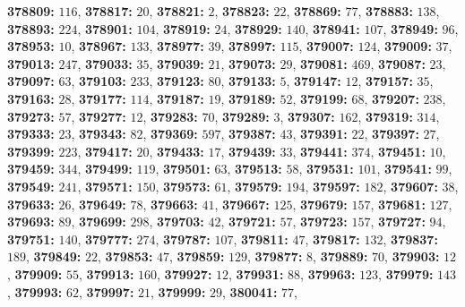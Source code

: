 \textsf{\bfseries 378809:} $116$, \textsf{\bfseries 378817:} $20$, \textsf{\bfseries 378821:} $2$, \textsf{\bfseries 378823:} $22$, \textsf{\bfseries 378869:} $77$, \textsf{\bfseries 378883:} $138$, \textsf{\bfseries 378893:} $224$, \textsf{\bfseries 378901:} $104$, \textsf{\bfseries 378919:} $24$, \textsf{\bfseries 378929:} $140$, \textsf{\bfseries 378941:} $107$, \textsf{\bfseries 378949:} $96$, \textsf{\bfseries 378953:} $10$, \textsf{\bfseries 378967:} $133$, \textsf{\bfseries 378977:} $39$, \textsf{\bfseries 378997:} $115$, \textsf{\bfseries 379007:} $124$, \textsf{\bfseries 379009:} $37$, \textsf{\bfseries 379013:} $247$, \textsf{\bfseries 379033:} $35$, \textsf{\bfseries 379039:} $21$, \textsf{\bfseries 379073:} $29$, \textsf{\bfseries 379081:} $469$, \textsf{\bfseries 379087:} $23$, \textsf{\bfseries 379097:} $63$, \textsf{\bfseries 379103:} $233$, \textsf{\bfseries 379123:} $80$, \textsf{\bfseries 379133:} $5$, \textsf{\bfseries 379147:} $12$, \textsf{\bfseries 379157:} $35$, \textsf{\bfseries 379163:} $28$, \textsf{\bfseries 379177:} $114$, \textsf{\bfseries 379187:} $19$, \textsf{\bfseries 379189:} $52$, \textsf{\bfseries 379199:} $68$, \textsf{\bfseries 379207:} $238$, \textsf{\bfseries 379273:} $57$, \textsf{\bfseries 379277:} $12$, \textsf{\bfseries 379283:} $70$, \textsf{\bfseries 379289:} $3$, \textsf{\bfseries 379307:} $162$, \textsf{\bfseries 379319:} $314$, \textsf{\bfseries 379333:} $23$, \textsf{\bfseries 379343:} $82$, \textsf{\bfseries 379369:} $597$, \textsf{\bfseries 379387:} $43$, \textsf{\bfseries 379391:} $22$, \textsf{\bfseries 379397:} $27$, \textsf{\bfseries 379399:} $223$, \textsf{\bfseries 379417:} $20$, \textsf{\bfseries 379433:} $17$, \textsf{\bfseries 379439:} $33$, \textsf{\bfseries 379441:} $374$, \textsf{\bfseries 379451:} $10$, \textsf{\bfseries 379459:} $344$, \textsf{\bfseries 379499:} $119$, \textsf{\bfseries 379501:} $63$, \textsf{\bfseries 379513:} $58$, \textsf{\bfseries 379531:} $101$, \textsf{\bfseries 379541:} $99$, \textsf{\bfseries 379549:} $241$, \textsf{\bfseries 379571:} $150$, \textsf{\bfseries 379573:} $61$, \textsf{\bfseries 379579:} $194$, \textsf{\bfseries 379597:} $182$, \textsf{\bfseries 379607:} $38$, \textsf{\bfseries 379633:} $26$, \textsf{\bfseries 379649:} $78$, \textsf{\bfseries 379663:} $41$, \textsf{\bfseries 379667:} $125$, \textsf{\bfseries 379679:} $157$, \textsf{\bfseries 379681:} $127$, \textsf{\bfseries 379693:} $89$, \textsf{\bfseries 379699:} $298$, \textsf{\bfseries 379703:} $42$, \textsf{\bfseries 379721:} $57$, \textsf{\bfseries 379723:} $157$, \textsf{\bfseries 379727:} $94$, \textsf{\bfseries 379751:} $140$, \textsf{\bfseries 379777:} $274$, \textsf{\bfseries 379787:} $107$, \textsf{\bfseries 379811:} $47$, \textsf{\bfseries 379817:} $132$, \textsf{\bfseries 379837:} $189$, \textsf{\bfseries 379849:} $22$, \textsf{\bfseries 379853:} $47$, \textsf{\bfseries 379859:} $129$, \textsf{\bfseries 379877:} $8$, \textsf{\bfseries 379889:} $70$, \textsf{\bfseries 379903:} $12$, \textsf{\bfseries 379909:} $55$, \textsf{\bfseries 379913:} $160$, \textsf{\bfseries 379927:} $12$, \textsf{\bfseries 379931:} $88$, \textsf{\bfseries 379963:} $123$, \textsf{\bfseries 379979:} $143$, \textsf{\bfseries 379993:} $62$, \textsf{\bfseries 379997:} $21$, \textsf{\bfseries 379999:} $29$, \textsf{\bfseries 380041:} $77$, 

